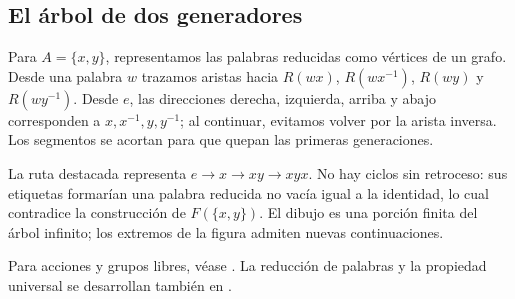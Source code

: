 \subsection{El árbol de dos generadores}
Para $A=\{x,y\}$, representamos las palabras reducidas como vértices de un grafo. Desde una palabra $w$ trazamos aristas hacia $R(wx)$, $R(wx^{-1})$, $R(wy)$ y $R(wy^{-1})$. Desde $e$, las direcciones derecha, izquierda, arriba y abajo corresponden a $x,x^{-1},y,y^{-1}$; al continuar, evitamos volver por la arista inversa. Los segmentos se acortan para que quepan las primeras generaciones.
\begin{center}\end{center}
La ruta destacada representa $e\to x\to xy\to xyx$. No hay ciclos sin retroceso: sus etiquetas formarían una palabra reducida no vacía igual a la identidad, lo cual contradice la construcción de $F(\{x,y\})$. El dibujo es una porción finita del árbol infinito; los extremos de la figura admiten nuevas continuaciones.

\begin{obs}
Para acciones y grupos libres, véase \citet[cap.~II, 4.1/3/5--8 y 5.1/3]{aluffi2009}. La reducción de palabras y la propiedad universal se desarrollan también en \citet[cap.~2, proposiciones 2.1--3, pp.~32--33]{milne2025}.
\end{obs}
